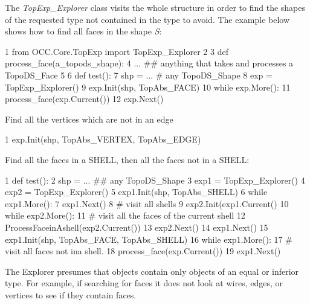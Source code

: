 The {\itshape Top\+Exp\+\_\+\+Explorer} class visits the whole structure in order to find the shapes of the requested type not contained in the type to avoid. The example below shows how to find all faces in the shape {\itshape S}\+:


\begin{DoxyCode}
1 \textcolor{keyword}{from} OCC.Core.TopExp \textcolor{keyword}{import} TopExp\_Explorer
2 
3 \textcolor{keyword}{def }process\_face(a\_topods\_shape):
4   ... \textcolor{comment}{## anything that takes and processes a TopoDS\_Face}
5 
6 \textcolor{keyword}{def }test():
7   shp = ... \textcolor{comment}{# any TopoDS\_Shape }
8   exp = TopExp\_Explorer()
9   exp.Init(shp, TopAbs\_FACE)
10   \textcolor{keywordflow}{while} exp.More():
11     process\_face(exp.Current())
12     exp.Next()
\end{DoxyCode}


Find all the vertices which are not in an edge


\begin{DoxyCode}
1 exp.Init(shp, TopAbs\_VERTEX, TopAbs\_EDGE)
\end{DoxyCode}


Find all the faces in a S\+H\+E\+LL, then all the faces not in a S\+H\+E\+LL\+:


\begin{DoxyCode}
1 \textcolor{keyword}{def }test():
2   shp = ... \textcolor{comment}{## any TopoDS\_Shape}
3   exp1 = TopExp\_Explorer()
4   exp2 = TopExp\_Explorer()
5   exp1.Init(shp, TopAbs\_SHELL)
6   \textcolor{keywordflow}{while} exp1.More():
7     exp1.Next() 
8     \textcolor{comment}{# visit all shells}
9     exp2.Init(exp1.Current()
10     \textcolor{keywordflow}{while} exp2.More():
11      \textcolor{comment}{# visit all the faces of the current shell }
12      ProcessFaceinAshell(exp2.Current())
13      exp2.Next()
14     exp1.Next()
15   exp1.Init(shp, TopAbs\_FACE, TopAbs\_SHELL)
16   \textcolor{keywordflow}{while} exp1.More():
17     \textcolor{comment}{# visit all faces not ina shell. }
18     process\_face(exp.Current())
19     exp1.Next()
\end{DoxyCode}


The Explorer presumes that objects contain only objects of an equal or inferior type. For example, if searching for faces it does not look at wires, edges, or vertices to see if they contain faces.

